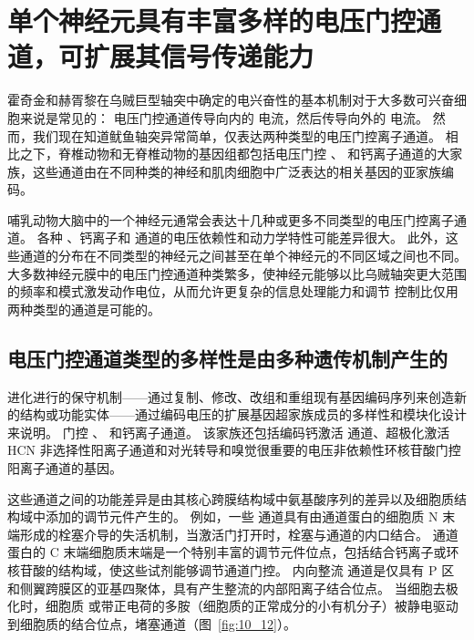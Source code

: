 \section{单个神经元具有丰富多样的电压门控通道，可扩展其信号传递能力}

霍奇金和赫胥黎在乌贼巨型轴突中确定的电兴奋性的基本机制对于大多数可兴奋细胞来说是常见的：
电压门控通道传导向内的  电流，然后传导向外的  电流。
然而，我们现在知道鱿鱼轴突异常简单，仅表达两种类型的电压门控离子通道。
相比之下，脊椎动物和无脊椎动物的基因组都包括电压门控 、 和钙离子通道的大家族，这些通道由在不同种类的神经和肌肉细胞中广泛表达的相关基因的亚家族编码。


哺乳动物大脑中的一个神经元通常会表达十几种或更多不同类型的电压门控离子通道。
各种 、钙离子和  通道的电压依赖性和动力学特性可能差异很大。
此外，这些通道的分布在不同类型的神经元之间甚至在单个神经元的不同区域之间也不同。
大多数神经元膜中的电压门控通道种类繁多，使神经元能够以比乌贼轴突更大范围的频率和模式激发动作电位，从而允许更复杂的信息处理能力和调节 控制比仅用两种类型的通道是可能的。



\subsection{电压门控通道类型的多样性是由多种遗传机制产生的}

进化进行的保守机制——通过复制、修改、改组和重组现有基因编码序列来创造新的结构或功能实体——通过编码电压的扩展基因超家族成员的多样性和模块化设计来说明。 
门控 、 和钙离子通道。
该家族还包括编码钙激活  通道、超极化激活 HCN 非选择性阳离子通道和对光转导和嗅觉很重要的电压非依赖性环核苷酸门控阳离子通道的基因。


这些通道之间的功能差异是由其核心跨膜结构域中氨基酸序列的差异以及细胞质结构域中添加的调节元件产生的。 
例如，一些  通道具有由通道蛋白的细胞质 N 末端形成的栓塞介导的失活机制，当激活门打开时，栓塞与通道的内口结合。
通道蛋白的 C 末端细胞质末端是一个特别丰富的调节元件位点，包括结合钙离子或环核苷酸的结构域，使这些试剂能够调节通道门控。
内向整流  通道是仅具有 P 区和侧翼跨膜区的亚基四聚体，具有产生整流的内部阳离子结合位点。
当细胞去极化时，细胞质  或带正电荷的多胺（细胞质的正常成分的小有机分子）被静电驱动到细胞质的结合位点，堵塞通道（图~\ref{fig:10_12}）。


